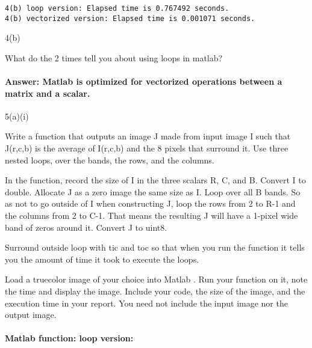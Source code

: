 \documentclass[11pt]{article}
\begin{document}
    \begin{Verbatim}[commandchars=\\\{\}]
4(b) loop version: Elapsed time is 0.767492 seconds.
4(b) vectorized version: Elapsed time is 0.001071 seconds.

    \end{Verbatim}

    4(b)

What do the 2 times tell you about using loops in matlab?

\hypertarget{answer-matlab-is-optimized-for-vectorized-operations-between-a-matrix-and-a-scalar.}{%
\paragraph{Answer: Matlab is optimized for vectorized operations between
a matrix and a
scalar.}\label{answer-matlab-is-optimized-for-vectorized-operations-between-a-matrix-and-a-scalar.}}

    5(a)(i)

Write a function that outputs an image J made from input image I such
that J(r,c,b) is the average of I(r,c,b) and the 8 pixels that surround
it. Use three nested loops, over the bands, the rows, and the columns.

In the function, record the size of I in the three scalars R, C, and B.
Convert I to double. Allocate J as a zero image the same size as I. Loop
over all B bands. So as not to go outside of I when constructing J, loop
the rows from 2 to R-1 and the columns from 2 to C-1. That means the
resulting J will have a 1-pixel wide band of zeros around it. Convert J
to uint8.

Surround outside loop with tic and toc so that when you run the function
it tells you the amount of time it took to execute the loops.

Load a truecolor image of your choice into Matlab . Run your function on
it, note the time and display the image. Include your code, the size of
the image, and the execution time in your report. You need not include
the input image nor the output image.

\hypertarget{matlab-function-loop-version}{%
\paragraph{Matlab function: loop
version:}\label{matlab-function-loop-version}}
\end{document}
